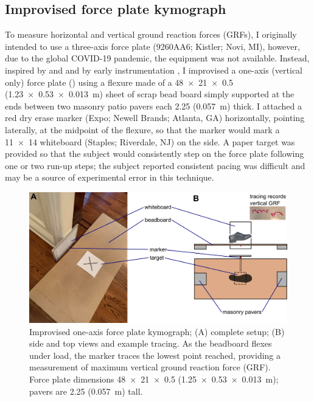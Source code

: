 \subsection{Improvised force plate kymograph}
To measure horizontal and vertical ground reaction forces (GRFs), I originally intended to use a three-axis force plate (9260AA6; Kistler; Novi, MI), however, due to the global COVID-19 pandemic, the equipment was not available. Instead, inspired by \citet{denny1983simple} and \citet{bell1984quantifying} and by early instrumentation \citep{baker2007history, mayer2010physiological, marey1873locomotion, carlet1872essai}, I improvised a one-axis (vertical only) force plate () using a flexure made of a \SI{48 x 21 x 0.5}{\inch} (\SI{1.23 x 0.53 x 0.013}{\meter}) sheet of scrap bead board simply supported at the ends between two masonry patio pavers each \SI{2.25}{\inch} (\SI{0.057}{\meter}) thick. I attached a red dry erase marker (Expo; Newell Brands; Atlanta, GA) horizontally, pointing laterally, at the midpoint of the flexure, so that the marker would mark a \SI{11x14}{\inch} whiteboard (Staples; Riverdale, NJ) on the side. A paper target was provided so that the subject would consistently step on the force plate following one or two run-up steps; the subject reported consistent pacing was difficult and may be a source of experimental error in this technique.
\begin{figure}
\begin{center}
\includegraphics{figures/fig-methods-1.png}
\end{center}
\caption{Improvised one-axis force plate kymograph; (A) complete setup; (B) side and top views and example tracing. As the beadboard flexes under load, the marker traces the lowest point reached, providing a measurement of maximum vertical ground reaction force (GRF). Force plate dimensions \SI{48 x 21 x 0.5}{\inch} (\SI{1.25 x 0.53 x0.013}{\meter}); pavers are \SI{2.25}{\inch} (\SI{0.057}{\meter}) tall.}
\label{fig:methods:forceplate}
\end{figure}
